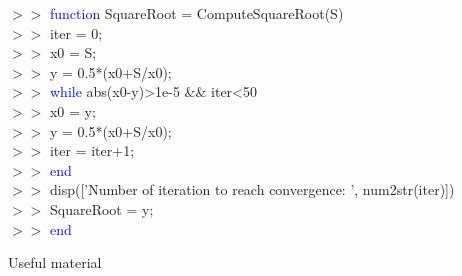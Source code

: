 \documentclass[xcolor={dvipsnames,rgb}, aspectratio=169]{beamer}
\begin{document}
\begin{frame}{}
\begin{tcolorbox}[colback=white,colframe=bluepoli]
   $>>$ \textcolor{blue}{function} SquareRoot = ComputeSquareRoot(S)\\
   $>>$ \hspace{1em}iter = 0;\\
   $>>$ \hspace{1em}x0 = S;\\
   $>>$ \hspace{1em}y = 0.5*(x0+S/x0);\\
   $>>$ \hspace{1em}\textcolor{blue}{while} abs(x0-y)>1e-5 \&\& iter<50\\
   $>>$ \hspace{1em}\hspace{1em}x0 = y;\\
   $>>$ \hspace{1em}\hspace{1em}y = 0.5*(x0+S/x0);\\
   $>>$ \hspace{1em}\hspace{1em}iter = iter+1;\\
   $>>$ \hspace{1em}\textcolor{blue}{end}\\
   $>>$ \hspace{1em}disp(['Number of iteration to reach convergence: ', num2str(iter)])\\
   $>>$ \hspace{1em}SquareRoot = y;\\
   $>>$ \textcolor{blue}{end}\\
\end{tcolorbox}
\end{frame}

{%
\begin{frame}[standout]
   Useful material
\end{frame}
}
\end{document}
